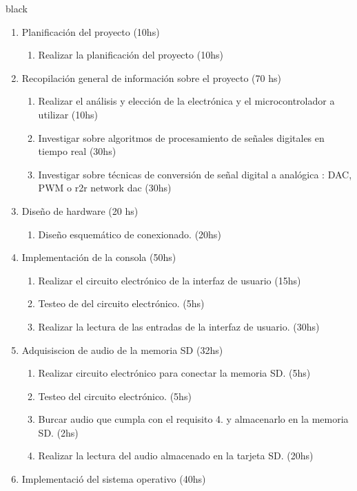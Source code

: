 \documentclass[11pt]{charter}
\begin{document}
\begin{consigna}{black}

\begin{enumerate}
\item Planificación del proyecto (10hs)
	\begin{enumerate}
	\item Realizar la planificación del proyecto (10hs)
	\end{enumerate}
\item Recopilación general de información sobre el proyecto (70 hs)
	\begin{enumerate}
	\item Realizar el análisis y elección de la electrónica y el microcontrolador a utilizar (10hs)
	\item Investigar sobre algoritmos de procesamiento de señales digitales en tiempo real (30hs)
	\item Investigar sobre técnicas de conversión de señal digital a analógica : DAC, PWM o r2r network 		dac (30hs)
	\end{enumerate}
\item Diseño de hardware (20 hs)
	\begin{enumerate}
	\item Diseño esquemático de conexionado. (20hs)
	\end{enumerate}
\item Implementación de la consola (50hs)
	\begin{enumerate}
	\item Realizar el circuito electrónico de la interfaz de usuario (15hs)
	\item Testeo de del circuito electrónico. (5hs)
	\item Realizar la lectura de las entradas de la interfaz de usuario. (30hs)
	\end{enumerate}
\item Adquisiscion de audio de la memoria SD (32hs)
	\begin{enumerate}
	\item Realizar circuito electrónico para conectar la memoria SD. (5hs)
	\item Testeo del circuito electrónico. (5hs)
	\item Burcar audio que cumpla con el requisito 4. y almacenarlo en la memoria SD. (2hs)
	\item Realizar la lectura del audio almacenado en la tarjeta SD. (20hs)
	\end{enumerate}
\item Implementació del sistema operativo (40hs)

\end{enumerate}
\end{consigna}
\end{document}
